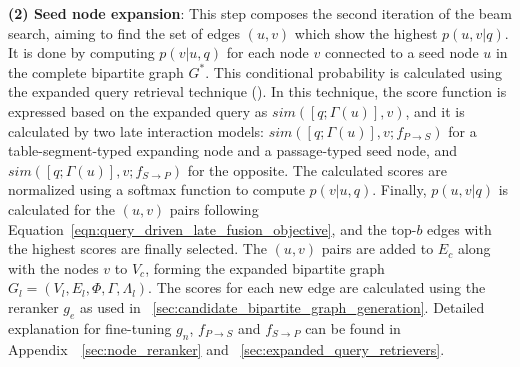 \textbf{(2) Seed node expansion}: 
This step composes the second iteration of the beam search, aiming to find the set of edges $(u, v)$ which show the highest $p(u, v|q)$.
It is done by computing $p(v|u,q)$ for each node $v$ connected to a seed node $u$ in the complete bipartite graph $G^*$.
This conditional probability is calculated using the expanded query retrieval technique (\citealp{expandedqueryretrieval}).
In this technique, the score function is expressed based on the expanded query as $sim([q;\Gamma(u)], v)$, and it is calculated by two late interaction models: 
$sim([q;\Gamma(u)], v; f_{P \rightarrow S})$
 for a table-segment-typed expanding node and a passage-typed seed node, and $sim([q;\Gamma(u)], v; f_{S \rightarrow P})$ for the opposite.
The calculated scores are normalized using a softmax function to compute $p(v|u,q)$.
Finally, $p(u, v|q)$ is calculated for the $(u, v)$ pairs following Equation~\ref{eqn:query_driven_late_fusion_objective}, and the top-$b$ edges with the highest scores are finally selected.
The $(u, v)$ pairs are added to $E_c$ along with the nodes $v$ to $V_c$, forming the expanded bipartite graph $G_l = (V_l, E_l, \Phi, \Gamma, \Lambda_l)$. 
The scores for each new edge are calculated using the reranker $g_e$ as used in \textsection~\ref{sec:candidate_bipartite_graph_generation}.
Detailed explanation for fine-tuning $g_n$, $f_{P\rightarrow S}$ and $f_{S\rightarrow P}$ can be found in Appendix~\textsection~\ref{sec:node_reranker} and \textsection~\ref{sec:expanded_query_retrievers}.

